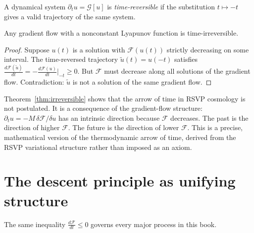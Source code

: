 \begin{definition}
  A dynamical system $\partial_t u = \mathcal{G}[u]$ is
  \emph{time-reversible} if the substitution $t \mapsto -t$
  gives a valid trajectory of the same system.
\end{definition}

\begin{theorem}
  \label{thm:irreversible}
  \statusproven{}
  Any gradient flow with a nonconstant Lyapunov function
  is time-irreversible.
\end{theorem}

\begin{proof}
  Suppose $u(t)$ is a solution with $\mathcal{F}(u(t))$
  strictly decreasing on some interval.
  The time-reversed trajectory $\tilde{u}(t) = u(-t)$ satisfies
  $\frac{d\mathcal{F}(\tilde{u})}{dt}
  = -\frac{d\mathcal{F}(u)}{dt}\big|_{-t} \geq 0$.
  But $\mathcal{F}$ must decrease along all solutions of the
  gradient flow.
  Contradiction: $\tilde{u}$ is not a solution of the same
  gradient flow.
\end{proof}

\begin{TechNote}
  Theorem~\ref{thm:irreversible} shows that the arrow of time
  in RSVP cosmology is not postulated.
  It is a consequence of the gradient-flow structure:
  $\partial_t u = -M\,\delta\mathcal{F}/\delta u$ has an
  intrinsic direction because $\mathcal{F}$ decreases.
  The past is the direction of higher $\mathcal{F}$.
  The future is the direction of lower $\mathcal{F}$.
  This is a precise, mathematical version of the thermodynamic
  arrow of time, derived from the RSVP variational structure
  rather than imposed as an axiom.
\end{TechNote}

\section{The descent principle as unifying structure}

The same inequality $\frac{d\mathcal{F}}{dt} \leq 0$ governs
every major process in this book.

